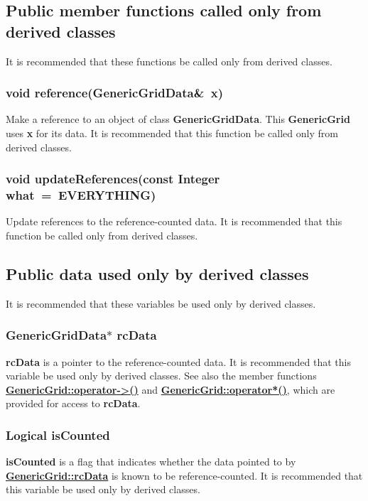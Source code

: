 \documentclass{article}
\begin{document}
  \subsection{Public member functions called only from derived classes}
  \label{GenericGrid::PublicDerivedClassMemberFunctions}

It is recommended that these functions be called only from derived classes.

  \subsubsection{void reference(GenericGridData\&~x)}
  \label{GenericGrid::reference(GenericGridData_x)}
    Make a reference to an object of class \textbf{GenericGridData}.
    This \textbf{GenericGrid} uses \textbf{x} for its data.
    It is recommended that this function be called only from derived classes.
  \subsubsection{void updateReferences(const Integer what~=~EVERYTHING)}
  \label{GenericGrid::updateReferences(what)}
    Update references to the reference-counted data.
    It is recommended that this function be called only from derived classes.

\subsection{Public data used only by derived classes}
\label{GenericGrid::PublicDerivedClassData}

It is recommended that these variables be used only by derived classes.

  \subsubsection{GenericGridData$*$ rcData}
  \label{GenericGrid::rcData}
    \textbf{rcData} is a pointer to the reference-counted data.
    It is recommended that this variable be used only by derived classes.
    See also the member functions
    {\bf{}\hyperref{operator${-}{>}$()}{operator${-}{>}$() \rm(\S}{)}{GenericGrid::operator->()}}
    and {\bf{}\hyperref{operator$*$()}{operator$*$() \rm(\S}{)}{GenericGrid::operator*()}},
    which are provided for access to \textbf{rcData}.

  \subsubsection{Logical isCounted}
  \label{GenericGrid::isCounted}
    \textbf{isCounted} is
    a flag that indicates whether the data pointed to by {\bf{}\hyperref{rcData}{rcData \rm(\S}{)}{GenericGrid::rcData}} is known to be reference-counted.
    It is recommended that this variable be used only by derived classes.
\end{document}
